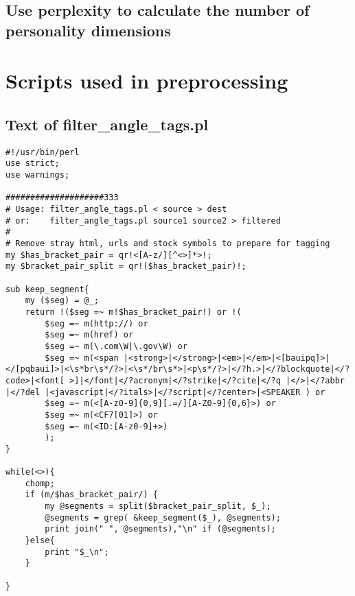 \documentclass[10pt,letterpaper]{book}
\begin{document}
\section{Use perplexity to calculate the number of personality dimensions}

\appendix
\chapter{Scripts used in preprocessing}
\section{Text of filter\_angle\_tags.pl}
\label{app:filterangletags}
\lstset{language=Perl}
\begin{lstlisting}
#!/usr/bin/perl
use strict;
use warnings;

####################333
# Usage: filter_angle_tags.pl < source > dest
# or:    filter_angle_tags.pl source1 source2 > filtered
#
# Remove stray html, urls and stock symbols to prepare for tagging
my $has_bracket_pair = qr!<[A-z/][^<>]*>!;
my $bracket_pair_split = qr!($has_bracket_pair)!;

sub keep_segment{
    my ($seg) = @_;
    return !($seg =~ m!$has_bracket_pair!) or !(
        $seg =~ m(http://) or
        $seg =~ m(href) or
        $seg =~ m(\.com\W|\.gov\W) or
        $seg =~ m(<span |<strong>|</strong>|<em>|</em>|<[bauipq]>|</[pqbaui]>|<\s*br\s*/?>|<\s*/br\s*>|<p\s*/?>|</?h.>|</?blockquote|</?code>|<font[ >]|</font|</?acronym|</?strike|</?cite|</?q |</>|</?abbr |</?del |<javascript|</?itals>|</?script|</?center>|<SPEAKER ) or
        $seg =~ m(<[A-z0-9]{0,9}[.=/][A-Z0-9]{0,6}>) or
        $seg =~ m(<CF7[01]>) or
        $seg =~ m(<ID:[A-z0-9]+>)
        );
}

while(<>){
    chomp;
    if (m/$has_bracket_pair/) {
        my @segments = split($bracket_pair_split, $_);
        @segments = grep( &keep_segment($_), @segments);
        print join(" ", @segments),"\n" if (@segments);
    }else{
        print "$_\n";
    }

}
\end{lstlisting}
\end{document}
